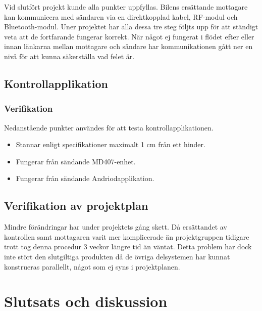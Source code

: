 \documentclass[a4paper]{article}
\begin{document}
\noindent
Vid slutfört projekt kunde alla punkter uppfyllas. Bilens ersättande mottagare kan kommunicera med sändaren via en direktkopplad kabel, RF-modul och Bluetooth-modul. Uner projektet har alla dessa tre steg följts upp för att ständigt veta att de fortfarande fungerar korrekt. När något ej fungerat i flödet efter eller innan länkarna mellan mottagare och sändare har kommunikationen gått ner en nivå för att kunna säkerställa vad felet är.

\subsection{Kontrollapplikation}
\subsubsection{Verifikation}
Nedanstående punkter användes för att testa kontrollapplikationen.

\begin{itemize}
\item Stannar enligt specifikationer maximalt 1 cm från ett hinder.
\item Fungerar från sändande MD407-enhet.
\item Fungerar från sändande Andriodapplikation.
\end{itemize}



\subsection{Verifikation av projektplan}
Mindre förändringar har under projektets gång skett. Då ersättandet av kontrollen samt mottagaren varit mer komplicerade än projektgruppen tidigare trott tog denna procedur 3 veckor längre tid än väntat. Detta problem har dock inte stört den slutgiltiga produkten då de övriga delsystemen har kunnat konstrueras parallellt, något som ej syns i projektplanen.




\newpage
\section{Slutsats och diskussion}


\newpage


\end{document}
